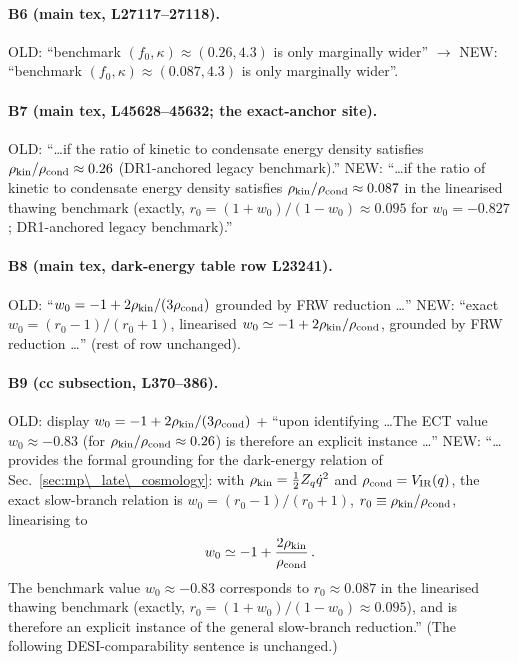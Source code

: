 \paragraph{B6 (main tex, L27117--27118).}
OLD: ``benchmark $(f_0,\kappa)\approx(0.26,4.3)$ is only
marginally wider'' $\to$ NEW: ``benchmark
$(f_0,\kappa)\approx(0.087,4.3)$ is only marginally wider''.

\paragraph{B7 (main tex, L45628--45632; the exact-anchor
site).}
OLD: ``\ldots if the ratio of kinetic to condensate energy
density satisfies $\rho_{\rm kin}/\rho_{\rm cond}\approx0.26$
(DR1-anchored legacy benchmark).''
NEW: ``\ldots if the ratio of kinetic to condensate energy
density satisfies $\rho_{\rm kin}/\rho_{\rm cond}\approx0.087$
in the linearised thawing benchmark (exactly,
$r_0=(1+w_0)/(1-w_0)\approx0.095$ for $w_0=-0.827$;
DR1-anchored legacy benchmark).''

\paragraph{B8 (main tex, dark-energy table row L23241).}
OLD: ``$w_0=-1+2\rho_{\rm kin}/(3\rho_{\rm cond})$ grounded by
FRW reduction \ldots''
NEW: ``exact $w_0=(r_0-1)/(r_0+1)$, linearised
$w_0\simeq-1+2\rho_{\rm kin}/\rho_{\rm cond}$, grounded by FRW
reduction \ldots'' (rest of row unchanged).

\paragraph{B9 (cc subsection, L370--386).}
OLD: display $w_0=-1+2\rho_{\rm kin}/(3\rho_{\rm cond})$ +
``upon identifying \ldots The ECT value $w_0\approx-0.83$ (for
$\rho_{\rm kin}/\rho_{\rm cond}\approx0.26$) is therefore an
explicit instance \ldots''
NEW: ``\ldots provides the formal grounding for the dark-energy
relation of Sec.~\ref{sec:mp\_late\_cosmology}: with
$\rho_{\rm kin}=\tfrac12 Z_q\dot q^2$ and
$\rho_{\rm cond}=V_{\rm IR}(q)$, the exact slow-branch relation
is $w_0=(r_0-1)/(r_0+1)$, $r_0\equiv\rho_{\rm kin}/
\rho_{\rm cond}$, linearising to
\begin{equation}
w_0 \simeq -1 + \frac{2\rho_{\rm kin}}{\rho_{\rm cond}}\,.
\end{equation}
The benchmark value $w_0\approx-0.83$ corresponds to
$r_0\approx0.087$ in the linearised thawing benchmark (exactly,
$r_0=(1+w_0)/(1-w_0)\approx0.095$), and is therefore an explicit
instance of the general slow-branch reduction.''
(The following DESI-comparability sentence is unchanged.)

